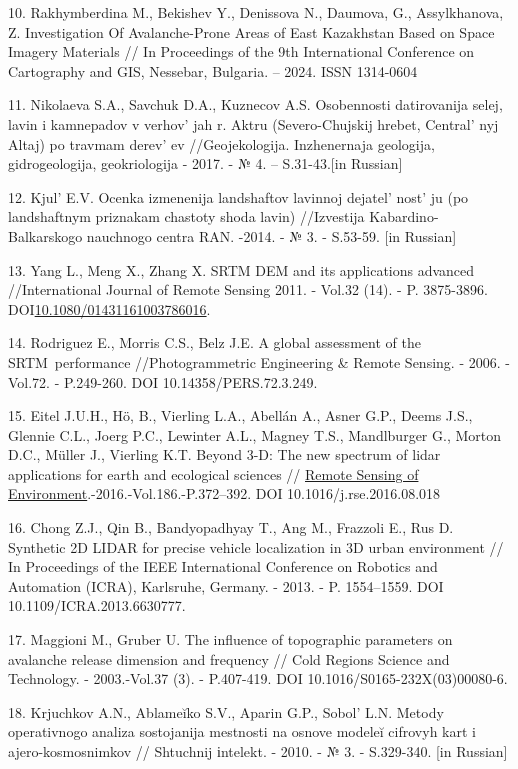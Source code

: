 10. Rakhymberdina M., Bekishev Y., Denissova N., Daumova, G.,
Assylkhanova, Z. Investigation Of Avalanche-Prone Areas of East
Kazakhstan Based on Space Imagery Materials // In Proceedings of the 9th
International Conference on Cartography and GIS, Nessebar, Bulgaria. --
2024. ISSN 1314-0604

11. Nikolaeva S.A., Savchuk D.A., Kuznecov A.S. Osobennosti datirovanija
selej, lavin i kamnepadov v verhov' jah r. Aktru
(Severo-Chujskij hrebet, Central' nyj Altaj) po travmam
derev' ev //Geojekologija. Inzhenernaja geologija,
gidrogeologija, geokriologija - 2017. - № 4. -- S.31-43.{[}in
Russian{]}

12. Kjul'{} E.V. Ocenka izmenenija landshaftov lavinnoj
dejatel' nost' ju (po landshaftnym
priznakam chastoty shoda lavin) //Izvestija Kabardino-Balkarskogo
nauchnogo centra RAN. -2014. - № 3. - S.53-59. {[}in Russian{]}

13. Yang L., Meng X., Zhang X. SRTM DEM and its applications advanced
//International Journal of Remote Sensing 2011. - Vol.32 (14). - P.
3875-3896.
DOI\href{http://dx.doi.org/10.1080/01431161003786016}{10.1080/01431161003786016}.

14. Rodriguez E., Morris C.S., Belz J.E. A global assessment of the
SRTM~performance //Photogrammetric Engineering \& Remote Sensing. -
2006. -Vol.72. - P.249-260. DOI 10.14358/PERS.72.3.249.

15. Eitel J.U.H., Hö, B., Vierling L.A., Abellán A., Asner G.P., Deems
J.S., Glennie C.L., Joerg P.C., Lewinter A.L., Magney T.S., Mandlburger
G., Morton D.C., Müller J., Vierling K.T. Beyond 3-D: The new spectrum
of lidar applications for earth and ecological sciences //
\href{https://asu.elsevierpure.com/en/publications/beyond-3-d-the-new-spectrum-of-lidar-applications-for-earth-and-e}{\hfill\break
Remote Sensing of Environment}.-2016.-Vol.186.-P.372--392. DOI
10.1016/j.rse.2016.08.018

16. Chong Z.J., Qin B., Bandyopadhyay T., Ang M., Frazzoli E., Rus D.
Synthetic 2D LIDAR for precise vehicle localization in 3D urban
environment // In Proceedings of the IEEE International Conference on
Robotics and Automation (ICRA), Karlsruhe, Germany. - 2013. - P.
1554--1559. DOI 10.1109/ICRA.2013.6630777.

17. Maggioni M., Gruber U. The influence of topographic parameters on
avalanche release dimension and frequency // Cold Regions Science and
Technology. - 2003.-Vol.37 (3). - P.407-419. DOI
10.1016/S0165-232X(03)00080-6.

18. Krjuchkov A.N., Ablameĭko S.V., Aparin G.P., Sobol'{}
L.N. Metody operativnogo analiza sostojanija mestnosti na osnove modeleĭ
cifrovyh kart i ajero-kosmosnimkov // Shtuchnij іntelekt. - 2010. - № 3.
- S.329-340. {[}in Russian{]}

